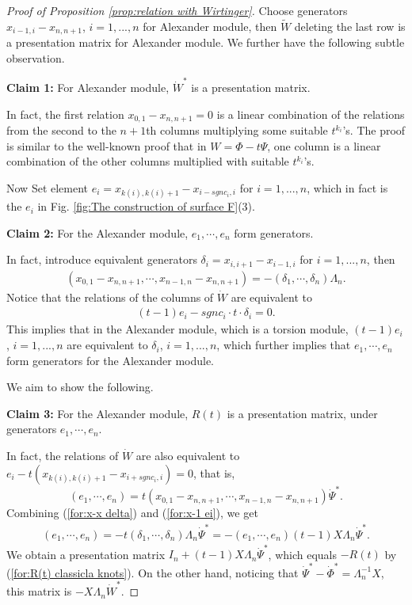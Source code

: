 \documentclass{amsart}
\theoremstyle{definition}
\theoremstyle{remark}
\numberwithin{equation}{subsection}
\begin{document}
\begin{proof}[Proof of Proposition \ref{prop:relation with  Wirtinger}]
Choose generators $x_{i-1,i} - x_{n,n+1}$, $i = 1,...,n$ for Alexander module, then $\tilde{W}$ deleting the last row is a presentation matrix for Alexander module. We further have the following subtle observation.

\textbf{Claim 1:} For Alexander module, $\dot{W}^{*}$ is a presentation matrix.

In fact, the first relation $x_{0,1} - x_{n,n+1} = 0$ is a linear combination of the relations from the second to the $n+1$th columns multiplying some suitable $t^{k_{i}}$'s. The proof is similar to the well-known proof that in $W = \Phi - t\Psi$, one column is a linear combination of the other columns multiplied with suitable $t^{k_{i}}$'s.

Now Set element $e_{i} = x_{k(i),k(i)+1} - x_{i-sgnc_{i},i}$ for $i = 1,...,n$, which in fact is the $e_{i} $ in Fig. \ref{fig:The construction of surface F}(3).

\textbf{Claim 2:} For the Alexander module, $e_{1}, \cdots, e_{n}$ form generators.

In fact, introduce equivalent generators $\delta_{i} = x_{i,i+1} - x_{i-1,i}$ for $i = 1,...,n$, then
\begin{align}
(x_{0,1} - x_{n,n+1}, \cdots, x_{n-1,n} - x_{n,n+1}) = -(\delta_{1}, \cdots, \delta_{n})\Lambda_{n}. \label{for:x-x delta}
\end{align}
Notice that the relations of the columns of $\dot{W}$ are equivalent to
\begin{align}
    (t-1)e_{i} - sgnc_{i} \cdot t \cdot \delta_{i} = 0.\label{for:x-1 ei}
\end{align}
This implies that in the Alexander module, which is a torsion module, $(t-1)e_{i}$, $i = 1,...,n$ are equivalent to $\delta_{i}$, $i = 1,...,n$, which further implies that $e_{1}, \cdots, e_{n}$ form generators for the Alexander module.

We aim to show the following.

\textbf{Claim 3:} For the Alexander module, $R(t)$ is a presentation matrix, under generators $e_{1}, \cdots, e_{n}$. 

In fact, the relations of $\dot{W}$ are also equivalent to $e_{i} - t(x_{k(i),k(i)+1} - x_{i+sgnc_{i},i}) = 0$, that is,
\[
(e_{1},\cdots,e_{n})=t(x_{0,1}-x_{n,n+1},\cdots,x_{n-1,n}-x_{n,n+1})\dot{\Psi}^{*}.
\]
Combining (\ref{for:x-x delta}) and (\ref{for:x-1 ei}), we get
\begin{align}
 (e_{1},\cdots,e_{n})=-t(\delta_{1},\cdots,\delta_{n})\Lambda_{n}\dot{\Psi}^{*}=-(e_{1},\cdots,e_{n})(t-1)X\Lambda_{n}\dot{\Psi}^{*}.
\end{align}
We obtain a presentation matrix $I_{n}+(t-1)X\Lambda_{n}\dot{\Psi}^{*}$, which equals $-R(t)$ by (\ref{for:R(t) classicla knots}).
On the other hand, noticing that $\dot{\Psi}^{*}-\dot{\Phi}^{*}=\Lambda_{n}^{-1}X$, this matrix is $ -X\Lambda_{n}\dot{W}^{*}$.
\end{proof}
\end{document}

